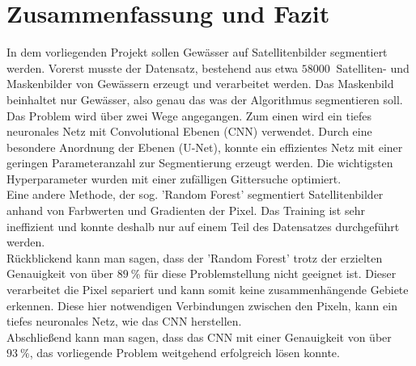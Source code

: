 \section{Zusammenfassung und Fazit}
\label{sec:zusammenfassung}
In dem vorliegenden Projekt sollen Gewässer auf Satellitenbilder segmentiert werden.
Vorerst musste der Datensatz, bestehend aus etwa $\SI{58000}{}$ Satelliten- und Maskenbilder von Gewässern erzeugt und verarbeitet werden.
Das Maskenbild beinhaltet nur Gewässer, also genau das was der Algorithmus segmentieren soll.
\\
Das Problem wird über zwei Wege angegangen.
Zum einen wird ein tiefes neuronales Netz mit Convolutional Ebenen (CNN) verwendet.
Durch eine besondere Anordnung der Ebenen (U-Net), konnte ein effizientes Netz mit einer geringen Parameteranzahl zur Segmentierung erzeugt werden.
Die wichtigsten Hyperparameter wurden mit einer zufälligen Gittersuche optimiert.
\\
Eine andere Methode, der sog. 'Random Forest' segmentiert Satellitenbilder anhand von Farbwerten und Gradienten der Pixel.
Das Training ist sehr ineffizient und konnte deshalb nur auf einem Teil des Datensatzes durchgeführt werden.
\\
Rückblickend kann man sagen, dass der 'Random Forest' trotz der erzielten Genauigkeit von über $\SI{89}{\percent}$ für diese Problemstellung nicht geeignet ist.
Dieser verarbeitet die Pixel separiert und kann somit keine zusammenhängende Gebiete erkennen.
Diese hier notwendigen Verbindungen zwischen den Pixeln, kann ein tiefes neuronales Netz, wie das CNN herstellen.
\\
Abschließend kann man sagen, dass das CNN mit einer Genauigkeit von über $\SI{93}{\percent}$, das vorliegende Problem weitgehend erfolgreich lösen konnte.